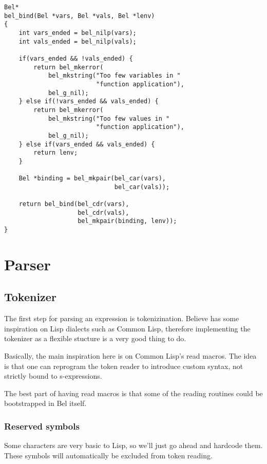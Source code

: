 \documentclass[openright,a4paper,twoside,12pt]{memoir}
\begin{document}
\begin{verbatim}
Bel*
bel_bind(Bel *vars, Bel *vals, Bel *lenv)
{
    int vars_ended = bel_nilp(vars);
    int vals_ended = bel_nilp(vals);

    if(vars_ended && !vals_ended) {
        return bel_mkerror(
            bel_mkstring("Too few variables in "
                         "function application"),
            bel_g_nil);
    } else if(!vars_ended && vals_ended) {
        return bel_mkerror(
            bel_mkstring("Too few values in "
                         "function application"),
            bel_g_nil);
    } else if(vars_ended && vals_ended) {
        return lenv;
    }

    Bel *binding = bel_mkpair(bel_car(vars),
                              bel_car(vals));

    return bel_bind(bel_cdr(vars),
                    bel_cdr(vals),
                    bel_mkpair(binding, lenv));
}
\end{verbatim}

\chapter{Parser}
\label{sec:org16f17de}

\section{Tokenizer}
\label{sec:org5f877c2}

The first  step for parsing  an expression is  tokenizination. Believe
has some inspiration  on Lisp dialects such as  Common Lisp, therefore
implementing the tokenizer as a flexible stucture is a very good thing
to do.

Basically,  the  main  inspiration  here  is  on  Common  Lisp's  read
macros.  The idea  is  that  one can  reprogram  the  token reader  to
introduce custom syntax, not strictly bound to s-expressions.

The  best part  of having  read  macros is  that some  of the  reading
routines could be bootstrapped in Bel itself.

\subsection{Reserved symbols}
\label{sec:org99efeb7}

Some characters  are very basic  to Lisp, so  we'll just go  ahead and
hardcode them. These symbols will automatically be excluded from token
reading.
\end{document}
